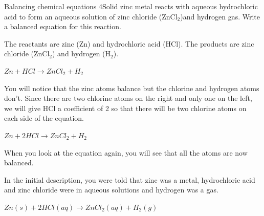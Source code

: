 	\par
\label{m38727*secfhsst!!!underscore!!!id967}\vspace{.5cm} 
      \noindent
\begin{wex}{Balancing chemical equations 4}{Solid zinc metal reacts with aqueous hydrochloric acid to form an aqueous solution of zinc chloride (ZnCl$_{2}$)and hydrogen gas. Write a balanced equation for this reaction.\\}

{
The reactants are zinc (Zn) and hydrochloric acid (HCl). The products are zinc chloride (ZnCl$_{2}$) and hydrogen (H$_{2}$).\\
}

{
\begin{center}
\rm${Zn + HCl \rightarrow ZnCl_{2} + H_{2}}$\\
\end{center}
}

{
You will notice that the zinc atoms balance but the chlorine and hydrogen atoms don't. Since there are two chlorine atoms on the right and only one on the left, we will give HCl a coefficient of 2 so that there will be two chlorine atoms on each side of the equation.

\begin{center}
\rm${Zn + 2HCl \rightarrow ZnCl_{2} + H_{2}}$\\
\end{center}
}

{
When you look at the equation again, you will see that all the atoms are now balanced.\\
}

{
In the initial description, you were told that zinc was a metal, hydrochloric acid and zinc chloride were in aqueous solutions and hydrogen was a gas.

\begin{center}
\rm${Zn(s) + 2HCl(aq) \rightarrow ZnCl_{2}(aq) + H_{2}(g)}$
\end{center}
}
\end{wex}
    \noindent
\par
            \label{m38727*secfhsst!!!underscore!!!id1086}\vspace{.5cm} 
